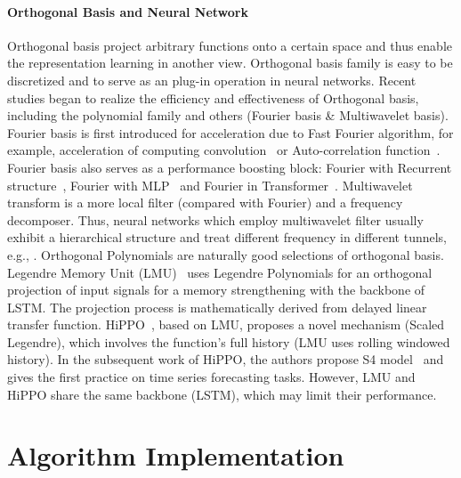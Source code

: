 \documentclass{article}
\begin{document}
\paragraph{Orthogonal Basis and Neural Network}
Orthogonal basis project arbitrary functions onto a certain space and thus enable the representation learning in another view. Orthogonal basis family is easy to be discretized and to serve as an plug-in operation in neural networks. Recent studies began to realize the efficiency and effectiveness of Orthogonal basis, including the polynomial family and others (Fourier basis \& Multiwavelet basis). Fourier basis is first introduced for acceleration due to Fast Fourier algorithm, for example, acceleration of computing convolution~\cite{Hippo} or Auto-correlation function~\cite{Autoformer}. Fourier basis also serves as a performance boosting block: Fourier with Recurrent structure~\cite{FourierRecurrentUnits}, Fourier with MLP~\cite{Fourier-Neural-Operator,FNet} and Fourier in Transformer~\cite{FedFormer}. Multiwavelet transform is a more local filter (compared with 
Fourier) and a frequency decomposer. Thus, neural networks which employ multiwavelet filter usually exhibit a hierarchical structure and treat different frequency in different tunnels, e.g., \cite{wang2018multilevel,Multiwavelet-based-Operator-Learning,FedFormer}. Orthogonal Polynomials are naturally good selections of orthogonal basis. Legendre Memory Unit (LMU)~\cite{LMU} uses Legendre Polynomials for an orthogonal projection of input signals for a memory strengthening with the backbone of LSTM. The projection process is mathematically derived from delayed linear transfer function. HiPPO~\cite{Hippo}, based on LMU, proposes a novel mechanism (Scaled Legendre), which involves the function's full history (LMU uses rolling windowed history). In the subsequent work of HiPPO, the authors propose S4 model~\cite{S4} and gives the first practice on time series forecasting tasks. However, LMU and HiPPO share the same backbone (LSTM), which may limit their performance. 











 \section{Algorithm Implementation}
\label{app:Alg}
\end{document}
